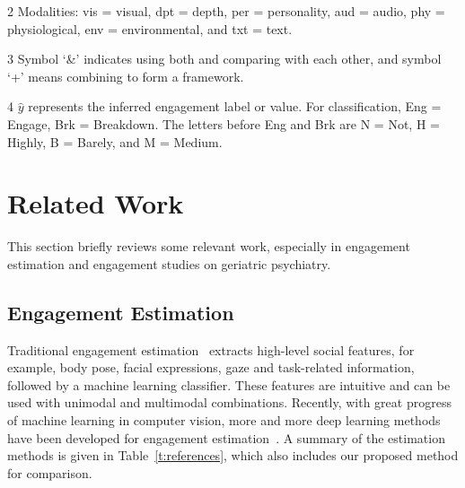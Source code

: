 \documentclass[twocolumn]{svjour3}
\begin{document}
\begin{table}[htb!]
\begin{threeparttable}[b]
\begin{tablenotes}
    \item [2] Modalities: vis = visual, dpt = depth, per = personality, aud = audio, phy = physiological, env = environmental, and txt = text.
    \item [3] Symbol `\&' indicates using both and comparing with each other, and symbol `+' means combining to form a framework.
    \item [4] $\hat{y}$ represents the inferred engagement label or value. For classification, Eng = Engage, Brk = Breakdown. The letters before Eng and Brk are N = Not, H = Highly, B = Barely, and M = Medium.
  \end{tablenotes}
 \end{threeparttable}
\end{table}

\section{Related Work}
\label{s:Related_Work}
This section briefly reviews some relevant work, especially in engagement estimation and engagement studies on geriatric psychiatry.

\subsection{Engagement Estimation}
\label{subs:Automated_Engagement_Estimation}

Traditional engagement estimation~\cite{Salam2017Fully, Celiktutan2019Multimodal, BenYoussef2019Early, Monkaresi2017Automated, Gao2020NGage} extracts high-level social features, for example, body pose, facial expressions, gaze and task-related information, followed by a machine learning classifier. These features are intuitive and can be used with unimodal and multimodal combinations.  Recently, with great progress of machine learning in computer vision, more and more deep learning methods have been developed for engagement estimation~\cite{Saleh2021Improving, DelDuchetto2020Are, Zhu2020Multirate, Guhan2020ABCNet, Rudovic2019Personalized, Sumer2021Multimodal, Anagnostopoulou2021Engagement}. A summary of the estimation methods is given in Table~\ref{t:references}, which also includes our proposed method for comparison.
\end{document}
